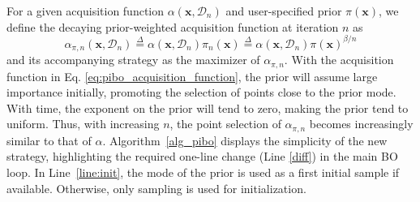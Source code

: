 \documentclass{article}
\newcommand{\method}[0]{\text{${\pi}$BO}\xspace}
\newcommand{\pri}[0]{{\pi}}
\begin{document}
For a given acquisition function $\alpha(\bm{x},\mathcal{D}_n)$ and user-specified prior $\pi(\bm{x})$, we define the decaying prior-weighted acquisition function at iteration $n$ as
\begin{equation}
    \alpha_{\pri, n}(\bm{x}, \mathcal{D}_n) \overset{\Delta}{=} \alpha(\bm{x}, \mathcal{D}_n) \pri_n(\bm{x}) \overset{\Delta}{=} \alpha(\bm{x}, \mathcal{D}_n) \pri(\bm{x})^{\beta/n} 
    \label{eq:pibo_acquisition_function}
\end{equation}
and its accompanying strategy as the maximizer of $\alpha_{\pri, n}$. With the acquisition function in Eq. \eqref{eq:pibo_acquisition_function}, the prior will assume large importance initially, promoting the selection of points close to the prior mode. With time, the exponent on the prior will tend to zero, making the prior tend to uniform. Thus, with increasing $n$, the point selection of $\alpha_{\pri, n}$ becomes increasingly similar to that of $\alpha$. 
Algorithm~\ref{alg_pibo} displays the simplicity of the new strategy, highlighting the required one-line change  (Line \ref{diff}) in the main BO loop. In Line~\ref{line:init}, the mode of the prior is used as a first initial sample if available. Otherwise, only sampling is used for initialization.
\end{document}
